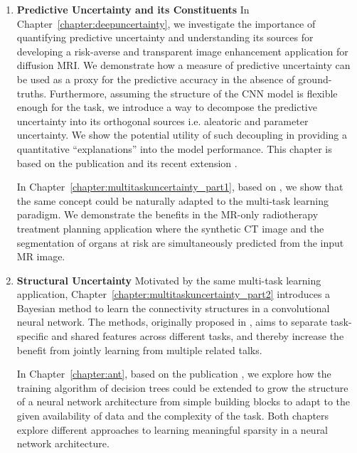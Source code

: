 \begin{enumerate}[label=(\alph*)]
	\item \textbf{Predictive Uncertainty and its Constituents} In Chapter~\ref{chapter:deepuncertainty}, we investigate the importance of quantifying predictive uncertainty and understanding its sources for developing a risk-averse and transparent image enhancement application for diffusion MRI. We demonstrate how a measure of predictive uncertainty can be used as a proxy for the predictive accuracy in the absence of ground-truths. Furthermore, assuming the structure of the CNN model is flexible enough for the task, we introduce a way to decompose the predictive uncertainty into its orthogonal sources i.e. aleatoric and parameter uncertainty. We show the potential utility of such decoupling in providing a quantitative ``explanations'' into the model performance. This chapter is based on the publication  \cite{tanno2017bayesian} and its recent extension \cite{tannonimg2019}. 
	
	In Chapter~\ref{chapter:multitaskuncertainty_part1}, based on \cite{bragman2018multi}, we show that the same concept could be naturally adapted to the multi-task learning paradigm. We demonstrate the benefits in the MR-only radiotherapy treatment planning application where the synthetic CT image and the segmentation of organs at risk are simultaneously predicted from the input MR image. 
	
	\item \textbf{Structural Uncertainty} 	Motivated by the same multi-task learning application, Chapter~\ref{chapter:multitaskuncertainty_part2} introduces a Bayesian method to learn the connectivity structures in a convolutional neural network. The methods, originally proposed in \cite{sfg2019},  aims to separate task-specific and shared features across different tasks, and thereby increase the benefit from jointly learning from multiple related talks. 
	
	In Chapter~\ref{chapter:ant}, based on the publication \cite{AdaptiveNeuralTrees19}, we explore how the training algorithm of decision trees could be extended to grow the structure of a neural network architecture from simple building blocks to adapt to the given availability of data and the complexity of the task. Both chapters explore different approaches to learning meaningful sparsity in a neural network architecture. 
	

\end{enumerate}
